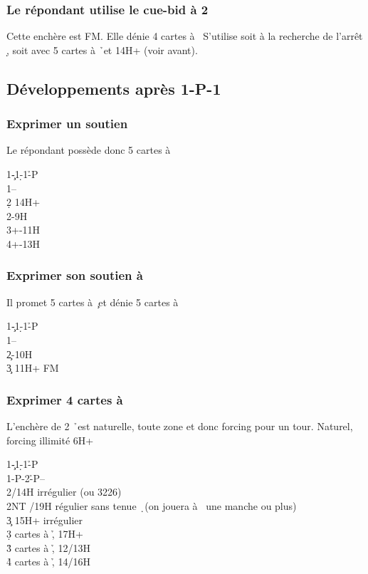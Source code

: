 \documentclass[a4paper]{article}
\begin{document}
\subsubsection{Le répondant utilise le cue-bid à 2 \pdfd}

Cette enchère est FM. Elle dénie 4 cartes à \s\ 
S’utilise soit à la recherche de l’arrêt \d , soit avec 5 cartes à \h\ et 14H+ (voir avant).

\subsection{Développements après 1\pdfh-P-1\pdfs}

\subsubsection{Exprimer un soutien \pdfs}

Le répondant possède donc 5 cartes à \s 

\begin{bidtable}
1\c-1\d-1\h-P\\
1\s--\\
2\d \> 14H+\\
2\s {}-9H\\
3\s {}+-11H\\
4\s {}+-13H
\end{bidtable}

\subsubsection{Exprimer son soutien à \pdfc}

Il promet 5 cartes à \c\ et dénie 5 cartes à \s 

\begin{bidtable}
1\c-1\d-1\h-P\\
1\s--\\
2\c {}-10H\\
3\c \> 11H+ FM
\end{bidtable}

\subsubsection{Exprimer 4 cartes à \pdfh}

L’enchère de 2 \h\ est naturelle, toute zone et donc forcing pour un tour.
Naturel, forcing illimité 6H+

\begin{bidtable}
1\c-1\d-1\h-P\\
1\s-P-2\h-P--\\
2\s {}/14H irrégulier (ou 3226)\\
2NT /19H régulier sans tenue \d\ (on jouera à \s\ une manche ou plus)\\
3\c \> 15H+ irrégulier\\
3\d {} cartes à \h , 17H+\\
3\h {} cartes à \h , 12/13H\\
4\h \> 4 cartes à \h , 14/16H
\end{bidtable}
\end{document}
